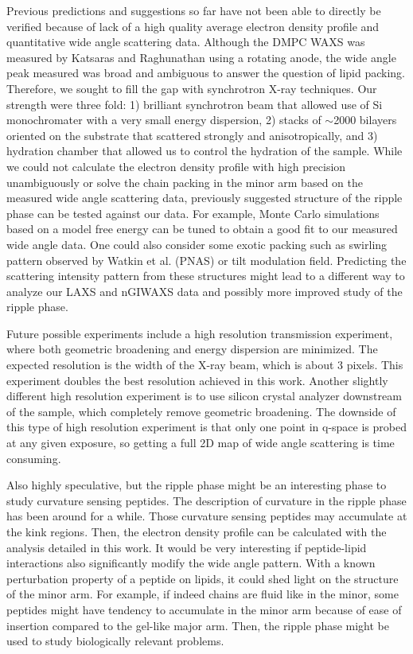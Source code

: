 Previous predictions and suggestions so far have not been able to 
directly be verified because of lack of a high quality average electron
density profile and quantitative wide angle 
scattering data. Although the DMPC WAXS was measured by Katsaras
and Raghunathan \cite{ref:Katsaras95} using a rotating anode,
the wide angle peak measured was broad and ambiguous to answer
the question of lipid packing. Therefore, we sought to fill the gap
with synchrotron X-ray techniques. Our strength were three fold: 1) brilliant
synchrotron beam that allowed use of Si monochromater with a very small
energy dispersion, 2) stacks of $\sim$2000 bilayers oriented on the substrate
that scattered strongly and anisotropically, and 3) hydration chamber that 
allowed us to control the hydration of the sample.
While we could not calculate the electron density profile with high precision unambiguously
or solve the chain packing in the minor arm based on the measured wide angle scattering data, 
previously suggested structure of the ripple phase can be tested against
our data.
For example, Monte Carlo simulations based on a model free energy can be tuned
to obtain a good fit to our measured wide angle data.
One could also consider some exotic packing such as swirling pattern observed
by Watkin et al. (PNAS) or tilt modulation field. Predicting the scattering
intensity pattern from these structures might lead to a different way
to analyze our LAXS and nGIWAXS data and possibly more improved study of the 
ripple phase. 

Future possible experiments
include a high resolution transmission experiment, where both geometric 
broadening and energy dispersion are minimized. The expected resolution 
is the width of the X-ray beam, which is about 3 pixels. This experiment 
doubles the best resolution achieved in this work. 
Another slightly different high resolution experiment is to use silicon 
crystal analyzer downstream of the sample, which completely remove geometric
broadening. The downside of this type of high resolution experiment is that
only one point in q-space is probed at any given exposure, so getting a full
2D map of wide angle scattering is time consuming.  

Also highly speculative, but the ripple phase might be an interesting phase
to study curvature sensing peptides. The description of curvature in the
ripple phase has been around for a while. Those curvature sensing peptides
may accumulate at the kink regions. Then, the electron density profile
can be calculated with the analysis detailed in this work. It would 
be very interesting if peptide-lipid interactions also significantly 
modify the wide angle pattern. With a known perturbation property of 
a peptide on lipids, it could shed light on the structure of the minor arm.
For example, if indeed chains are fluid like in the minor, some peptides
might have tendency to accumulate in the minor arm because of ease of 
insertion compared to the gel-like major arm.
Then, the ripple phase might be used to study biologically relevant problems.
